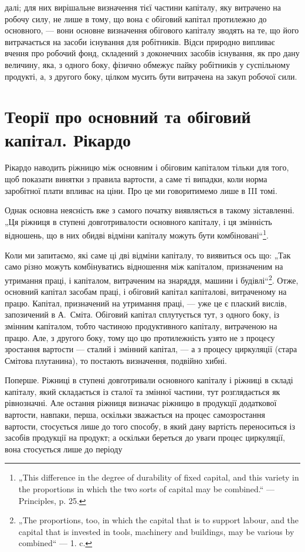 \parcont{}  %
далі; для них вирішальне визначення тієї частини капіталу, яку витрачено
на робочу силу, не лише в тому, що вона є обіговий капітал протилежно
до основного, — вони основне визначення обігового капіталу зводять
на те, що його витрачається на засоби існування для робітників.
Відси природно випливає вчення про робочий фонд, складений з доконечних
засобів існування, як про дану величину, яка, з одного боку,
фізично обмежує пайку робітників у суспільному продукті, а, з другого
боку, цілком мусить бути витрачена на закуп робочої сили.

\section{Теорії про основний та обіговий капітал. Рікардо}

Рікардо наводить ріжницю між основним і обіговим капіталом тільки
для того, щоб показати винятки з правила вартости, а саме ті випадки,
коли норма заробітної плати впливає на ціни. Про це ми говоритимемо
лише в III томі.

Однак основна неясність вже з самого початку виявляється в такому
зіставленні. „Ця ріжниця в ступені довготривалости основного капіталу,
і ця змінність відношень, що в них обидві відміни капіталу можуть бути
комбіновані“\footnote{
„This difference in the degree of durability of fixed capital, and this variety
in the proportions in which the two sorts of capital may be combined.“ — Principles,
p. 25.
}.

Коли ми запитаємо, які саме ці дві відміни капіталу, то виявиться ось
що: „Так само різно можуть комбінуватись відношення між капіталом,
призначеним на утримання праці, і капіталом, витраченим на знаряддя,
машини і будівлі“\footnote{
„The proportions, too, in which the capital that is to support labour, and the
capital that is invested in tools, machinery and buildings, may be various by combined“
— 1. c.
}. Отже, основний капітал \deq{} засобам праці, і обіговий
капітал \deq{} капіталові, витраченому на працю. Капітал, призначений на
утримання праці, — уже це є плаский вислів, запозичений в А.~Сміта.
Обіговий капітал сплутується тут, з одного боку, із змінним капіталом,
тобто частиною продуктивного капіталу, витраченою на працю. Але,
з другого боку, тому що цю протилежність узято не з процесу зростання
вартости — сталий і змінний капітал, — а з процесу циркуляції (стара Смітова
плутанина), то постають визначення, подвійно хибні.

Поперше. Ріжниці в ступені довготривали основного капіталу і
ріжниці в складі капіталу, який складається із сталої та змінної частини,
тут розглядається як рівнозначні. Але остання ріжниця визначає ріжницю
в продукції додаткової вартости, навпаки, перша, оскільки зважається на
процес самозростання вартости, стосується лише до того способу, в який
дану вартість переноситься із засобів продукції на продукт; а оскільки
береться до уваги процес циркуляції, вона стосується лише до періоду
\parbreak{}  %

